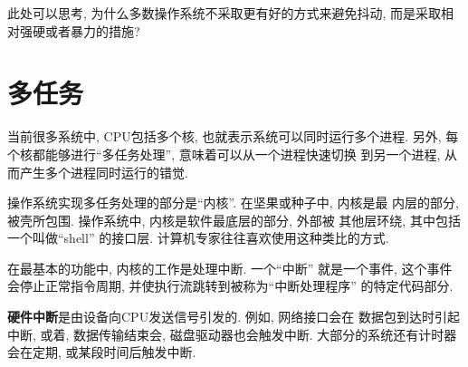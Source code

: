 \documentclass[12pt]{book}
\begin{document}
{\begin{note}
此处可以思考, 为什么多数操作系统不采取更有好的方式来避免抖动, 而是采取相对强硬或者暴力的措施?
\end{note}


\chapter{多任务}

当前很多系统中, CPU包括多个核, 也就表示系统可以同时运行多个进程. 
另外, 每个核都能够进行``多任务处理'', 意味着可以从一个进程快速切换
到另一个进程, 从而产生多个进程同时运行的错觉. 

操作系统实现多任务处理的部分是``内核''. 在坚果或种子中, 内核是最
内层的部分, 被壳所包围. 操作系统中, 内核是软件最底层的部分, 外部被
其他层环绕, 其中包括一个叫做``shell'' 的接口层. 
计算机专家往往喜欢使用这种类比的方式. 

在最基本的功能中, 内核的工作是处理中断. 一个``中断'' 就是一个事件, 
这个事件会停止正常指令周期, 并使执行流跳转到被称为``中断处理程序''
的特定代码部分.


 {\bf 硬件中断}是由设备向CPU发送信号引发的. 例如, 网络接口会在
 数据包到达时引起中断, 或着, 数据传输结束会, 磁盘驱动器也会触发中断.
 大部分的系统还有计时器会在定期, 或某段时间后触发中断.
 

}
\end{document}
